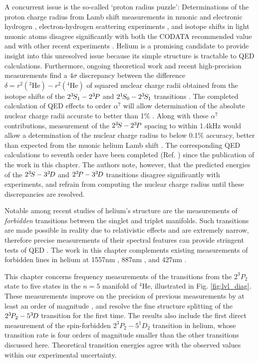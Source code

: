   A concurrent issue is the so-called `proton radius puzzle': Determinations of the proton charge radius from Lamb shift measurements in muonic and electronic hydrogen \cite{Pohl10, Bezginov19}, electron-hydrogen scattering experiments \cite{Beyer17,Xiong19}, and isotope shifts in light muonic atoms \cite{Kalinowski19,Pohl16} disagree significantly with both the CODATA recommended value and with other recent experiments \cite{Fleurbaey18}.
	 Helium is a promising candidate to provide insight into this unresolved issue because its simple structure is tractable to QED calculations.
	Furthermore, ongoing theoretical work \cite{Pachucki15,Pachucki17,Pachucki11,Pachucki10,Morton12,Morton06,Patkos16,Patkos17} and recent high-precision measurements \cite{Rooij11,Notermans14,Notermans16,Rengelink18} find a $4\sigma$ discrepancy between the difference $\delta = r^2(^3\textrm{He}) - r^2(^4\textrm{He})$ of squared nuclear charge radii obtained from the isotope shifts of the $2^{3\!}S_1 - 2^{3\!}P$ and ${2^{1\!}S_{0}} - 2^{3\!}S_1$ transitions \cite{Pachucki15,Patkos17}.
	The completed calculation of QED effects to order $\alpha^7$ will allow determination of the absolute nuclear charge radii accurate to better than 1\% \cite{Pachucki17}.
	Along with these $\alpha^7$ contributions, measurement of the $2^{3\!} S-2^{3\!} P$ spacing to within 1.4kHz would allow a determination of the nuclear charge radius to below 0.1\% accuracy, better than expected from the muonic helium Lamb shift \cite{Wienczek19}.
	The corresponding QED calculations to seventh order have been completed (Ref. \cite{Patkos21}) since the publication of the work in this chapter. 
	The authors note, however, that the predicted energies of the $2^{3\!} S - 3 ^{3\!} D$ and $2^{3\!} P - 3 ^{3\!} D$ transitions disagree significantly with experiments, and refrain from computing the nuclear charge radius until these discrepancies are resolved.
	 
  Notable among recent studies of helium's structure are the measurements of \emph{forbidden} transitions between the singlet and triplet manifolds.
	Such transitions are made possible in reality due to relativistic effects and are extremely narrow, therefore precise measurements of their spectral features can provide stringent tests of QED \cite{Lach01}.
	The work in this chapter complements existing measurements of forbidden lines in helium at 1557nm \cite{Rooij11,Rengelink18}, 887nm \cite{Notermans14}, and 427nm \cite{Thomas20}.

	This chapter concerns frequency measurements of the transitions from the $2^3P_2$ state to five states in the $n=5$ manifold of $^4$He, illustrated in Fig.
	\ref{fig:lvl_diag}.
	These measurements improve on the precision of previous measurements by at least an order of magnitude \cite{Martin60}, and resolve the fine structure splitting of the $2^{3\!}P_2 - 5^{3\!} D$ transition for the first time.
	The results also include the first direct measurement of the spin-forbidden $2^{3\!}P_2 - 5^{1\!}D_2$ transition in helium, whose transition rate is four orders of magnitude smaller than the other transitions discussed here.  
	Theoretical transition energies agree with the observed values within our experimental uncertainty.

